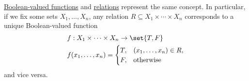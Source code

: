 \begin{remark}\label{rem:boolean_valued_functions_and_predicates}
  \hyperref[def:boolean_operator]{Boolean-valued functions} and \hyperref[def:relation]{relations} represent the same concept. In particular, if we fix some sets \( X_1, \ldots, X_n \), any relation \( R \subseteq X_1 \times \cdots \times X_n \) corresponds to a unique Boolean-valued function
  \begin{equation*}
    \begin{aligned}
      &f: X_1 \times \cdots \times X_n \to \set{ T, F } \\
      &f(x_1, \ldots, x_n) = \begin{cases}
        T, &(x_1, \ldots, x_n) \in R, \\
        F, &\T{otherwise}
      \end{cases}
    \end{aligned}
  \end{equation*}
  and vice versa.
\end{remark}

